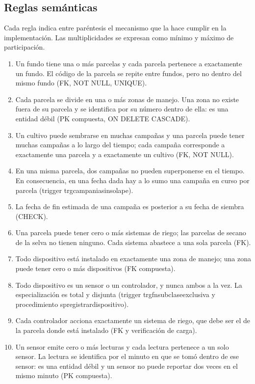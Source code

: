 \documentclass[11pt,letterpaper]{article}
\newcommand{\tbus}{\textunderscore\allowbreak}
\newcommand{\tb}[1]{{\ttfamily\let\_\tbus #1}}
\begin{document}
\subsection{Reglas semánticas}

Cada regla indica entre paréntesis el mecanismo que la hace cumplir en la implementación. Las multiplicidades se expresan como mínimo y máximo de participación.

\begin{enumerate}[label=\textbf{R\arabic*.},leftmargin=2.3em,itemsep=0.15em]
\item Un fundo tiene una o más parcelas y cada parcela pertenece a exactamente un fundo. El código de la parcela se repite entre fundos, pero no dentro del mismo fundo (FK, \tb{NOT NULL}, \tb{UNIQUE}).
\item Cada parcela se divide en una o más zonas de manejo. Una zona no existe fuera de su parcela y se identifica por su número dentro de ella: es una entidad débil (PK compuesta, \tb{ON DELETE CASCADE}).
\item Un cultivo puede sembrarse en muchas campañas y una parcela puede tener muchas campañas a lo largo del tiempo; cada campaña corresponde a exactamente una parcela y a exactamente un cultivo (FK, \tb{NOT NULL}).
\item En una misma parcela, dos campañas no pueden superponerse en el tiempo. En consecuencia, en una fecha dada hay a lo sumo una campaña en curso por parcela (trigger \tb{trg\_campania\_sin\_solape}).
\item La fecha de fin estimada de una campaña es posterior a su fecha de siembra (\tb{CHECK}).
\item Una parcela puede tener cero o más sistemas de riego; las parcelas de secano de la selva no tienen ninguno. Cada sistema abastece a una sola parcela (FK).
\item Todo dispositivo está instalado en exactamente una zona de manejo; una zona puede tener cero o más dispositivos (FK compuesta).
\item Todo dispositivo es un sensor o un controlador, y nunca ambos a la vez. La especialización es total y disjunta (trigger \tb{trg\_fn\_subclase\_exclusiva} y procedimiento \tb{sp\_registrar\_dispositivo}).
\item Cada controlador acciona exactamente un sistema de riego, que debe ser el de la parcela donde está instalado (FK y verificación de carga).
\item Un sensor emite cero o más lecturas y cada lectura pertenece a un solo sensor. La lectura se identifica por el minuto en que se tomó dentro de ese sensor: es una entidad débil y un sensor no puede reportar dos veces en el mismo minuto (PK compuesta).

\end{enumerate}
\end{document}

